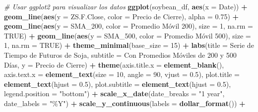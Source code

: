 \documentclass[
]{book}
\newenvironment{Shaded}{\begin{snugshade}}{\end{snugshade}}
\newcommand{\AttributeTok}[1]{\textcolor[rgb]{0.13,0.29,0.53}{#1}}
\newcommand{\CommentTok}[1]{\textcolor[rgb]{0.56,0.35,0.01}{\textit{#1}}}
\newcommand{\ConstantTok}[1]{\textcolor[rgb]{0.56,0.35,0.01}{#1}}
\newcommand{\DecValTok}[1]{\textcolor[rgb]{0.00,0.00,0.81}{#1}}
\newcommand{\FloatTok}[1]{\textcolor[rgb]{0.00,0.00,0.81}{#1}}
\newcommand{\FunctionTok}[1]{\textcolor[rgb]{0.13,0.29,0.53}{\textbf{#1}}}
\newcommand{\NormalTok}[1]{#1}
\newcommand{\SpecialCharTok}[1]{\textcolor[rgb]{0.81,0.36,0.00}{\textbf{#1}}}
\newcommand{\StringTok}[1]{\textcolor[rgb]{0.31,0.60,0.02}{#1}}
\begin{document}
\begin{Shaded}
\begin{Highlighting}[]
\CommentTok{\# Usar ggplot2 para visualizar los datos}
\FunctionTok{ggplot}\NormalTok{(soybean\_df, }\FunctionTok{aes}\NormalTok{(}\AttributeTok{x =}\NormalTok{ Date)) }\SpecialCharTok{+}
  \FunctionTok{geom\_line}\NormalTok{(}\FunctionTok{aes}\NormalTok{(}\AttributeTok{y =}\NormalTok{ ZS.F.Close, }\AttributeTok{color =} \StringTok{\textquotesingle{}Precio de Cierre\textquotesingle{}}\NormalTok{), }\AttributeTok{alpha =} \FloatTok{0.75}\NormalTok{) }\SpecialCharTok{+}
  \FunctionTok{geom\_line}\NormalTok{(}\FunctionTok{aes}\NormalTok{(}\AttributeTok{y =}\NormalTok{ SMA\_200, }\AttributeTok{color =} \StringTok{\textquotesingle{}Promedio Móvil 200\textquotesingle{}}\NormalTok{), }\AttributeTok{size =} \DecValTok{1}\NormalTok{, }\AttributeTok{na.rm =} \ConstantTok{TRUE}\NormalTok{) }\SpecialCharTok{+}
  \FunctionTok{geom\_line}\NormalTok{(}\FunctionTok{aes}\NormalTok{(}\AttributeTok{y =}\NormalTok{ SMA\_500, }\AttributeTok{color =} \StringTok{\textquotesingle{}Promedio Móvil 500\textquotesingle{}}\NormalTok{), }\AttributeTok{size =} \DecValTok{1}\NormalTok{, }\AttributeTok{na.rm =} \ConstantTok{TRUE}\NormalTok{) }\SpecialCharTok{+}
  \FunctionTok{theme\_minimal}\NormalTok{(}\AttributeTok{base\_size =} \DecValTok{15}\NormalTok{) }\SpecialCharTok{+}
  \FunctionTok{labs}\NormalTok{(}\AttributeTok{title =} \StringTok{\textquotesingle{}Serie de Tiempo de Futuros de Soja\textquotesingle{}}\NormalTok{,}
       \AttributeTok{subtitle =} \StringTok{\textquotesingle{}Con Promedios Móviles de 200 y 500 Días\textquotesingle{}}\NormalTok{,}
       \AttributeTok{y =} \StringTok{\textquotesingle{}Precio de Cierre\textquotesingle{}}\NormalTok{) }\SpecialCharTok{+}
  \FunctionTok{theme}\NormalTok{(}\AttributeTok{axis.title.x =} \FunctionTok{element\_blank}\NormalTok{(),}
        \AttributeTok{axis.text.x =} \FunctionTok{element\_text}\NormalTok{(}\AttributeTok{size =} \DecValTok{10}\NormalTok{, }\AttributeTok{angle =} \DecValTok{90}\NormalTok{, }\AttributeTok{vjust =} \FloatTok{0.5}\NormalTok{),}
        \AttributeTok{plot.title =} \FunctionTok{element\_text}\NormalTok{(}\AttributeTok{hjust =} \FloatTok{0.5}\NormalTok{),}
        \AttributeTok{plot.subtitle =} \FunctionTok{element\_text}\NormalTok{(}\AttributeTok{hjust =} \FloatTok{0.5}\NormalTok{),}
        \AttributeTok{legend.position =} \StringTok{"bottom"}\NormalTok{) }\SpecialCharTok{+}
  \FunctionTok{scale\_x\_date}\NormalTok{(}\AttributeTok{date\_breaks =} \StringTok{"1 year"}\NormalTok{, }\AttributeTok{date\_labels =} \StringTok{"\%Y"}\NormalTok{) }\SpecialCharTok{+}
  \FunctionTok{scale\_y\_continuous}\NormalTok{(}\AttributeTok{labels =} \FunctionTok{dollar\_format}\NormalTok{()) }\SpecialCharTok{+}

\end{Highlighting}
\end{Shaded}
\end{document}
